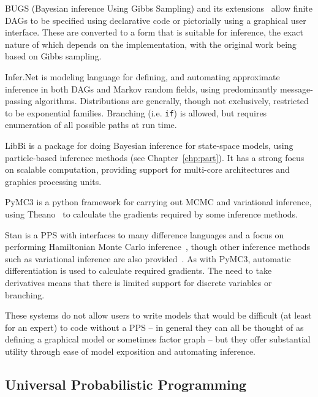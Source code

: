 BUGS (Bayesian inference Using Gibbs Sampling) \citep{spiegelhalter1996bugs} and its 
	extensions~\citep{lunn2000winbugs,plummer2003jags,todeschini2014biips}
	allow finite DAGs to be specified using declarative code or pictorially using a graphical user
	interface.  These are converted to a form that is suitable for inference, the exact nature of which
	depends on the implementation, with the original work being based on Gibbs sampling.
	
Infer.Net \citep{minka_software_2010} is modeling language for defining, and automating approximate inference in
	both DAGs and Markov random fields, using predominantly message-passing algorithms. Distributions
	are generally, though not exclusively, restricted to be exponential families.  Branching (i.e. \texttt{if}) 
	is allowed, but requires enumeration of all possible paths at run time.

LibBi \citep{murray2013bayesian} is a package for doing Bayesian inference for state-space models,
	using particle-based inference methods (see Chapter~\ref{chp:part}).  It has a strong focus on scalable
	computation, providing support for multi-core architectures and graphics processing units.

PyMC3 \citep{salvatier2016probabilistic} is a python framework for carrying out MCMC and variational
	inference, using Theano~\citep{bergstra2010theano} to calculate the gradients required by some inference methods.

Stan \citep{carpenter2015stan} is a PPS with interfaces to many difference languages and a
	focus on performing Hamiltonian Monte Carlo inference~\citep{duane1987hybrid,hoffman2014no}, though
	other inference methods such as variational inference are also provided~\citep{kucukelbir2015automatic}.
	As with PyMC3, automatic differentiation is used to calculate required gradients.  The need to take
	derivatives means that there is limited support for discrete variables or branching.

These systems do not allow users to write models that would be difficult (at least for
an expert) to code without a PPS -- in general they can all be thought of as defining a graphical model
or sometimes factor graph -- but they offer substantial utility through ease of model exposition and
automating inference.

\subsection{Universal Probabilistic Programming}
\label{sec:probprog:two:general}


